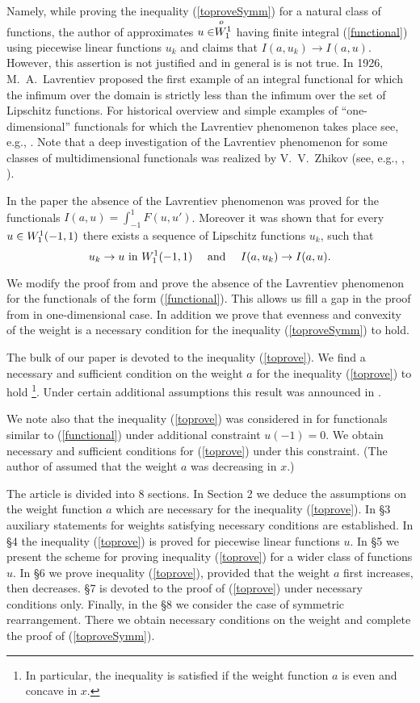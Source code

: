 Namely, while proving the inequality (\ref{toproveSymm}) for a natural class of functions,
the author of \cite{Br} approximates $u \in \stackrel{o\ }{W_1^1}$ having finite integral (\ref{functional})
using piecewise linear functions $u_k$ and claims that $I(a, u_k) \to I(a, u)$.
However, this assertion is not justified and in general is is not true.
In 1926, M.~A.~Lavrentiev proposed the first example of an integral functional
for which the infimum over the domain is strictly less than the infimum over the set of 
Lipschitz functions. For historical overview and simple examples of ``one-dimensional'' 
functionals for which the Lavrentiev phenomenon takes place see, e.g., \cite{BGH}.
Note that a deep investigation of the Lavrentiev phenomenon for some classes of multidimensional 
functionals was realized by V.~V.~Zhikov (see, e.g., \cite{Zh1}, \cite{Zh2}).

In the paper \cite{ASC} the absence of the Lavrentiev phenomenon was proved for the functionals
$I(a, u) = \int_{-1}^1 F(u, u')$. Moreover it was shown that for every $u \in W_1^1(-1, 1)$ 
there exists a sequence of Lipschitz functions $u_k$, such that
\begin{equation}
\label{convergence}
u_k \to u \text{ in } \W (-1, 1) \quad \text{ and } \quad I (a, u_k) \to I (a, u).
\end{equation}

We modify the proof from \cite{ASC} and prove the absence of the Lavrentiev phenomenon
for the functionals of the form (\ref{functional}).
This allows us fill a gap in the proof from \cite{Br} in one-dimensional case.
In addition we prove that evenness and convexity of the weight is a necessary condition
for the inequality (\ref{toproveSymm}) to hold.

The bulk of our paper is devoted to the inequality (\ref{toprove}).
We find a necessary and sufficient condition on the weight $a$ for the inequality 
(\ref{toprove}) to hold%
\footnote{In particular, the inequality is satisfied if the weight function $a$ is even 
and concave in $x$.}.
Under certain additional assumptions this result was announced in \cite{DAN}.

We note also that the inequality (\ref{toprove}) was considered in \cite{Lan}
for functionals similar to (\ref{functional}) under additional constraint $u(-1) = 0$.
We obtain necessary and sufficient conditions for (\ref{toprove}) under this constraint.
(The author of \cite{Lan} assumed that the weight $a$ was decreasing in $x$.)

The article is divided into 8 sections.
In Section 2 we deduce the assumptions on the weight function $a$ which are necessary for the 
inequality (\ref{toprove}).
In \S3 auxiliary statements for weights satisfying necessary conditions are established.
In \S4 the inequality (\ref{toprove}) is proved for piecewise linear functions $u$.
In \S5 we present the scheme for proving inequality (\ref{toprove}) for a wider class of 
functions $u$.
In \S6 we prove inequality (\ref{toprove}), provided that the weight $a$ first increases, 
then decreases.
\S7 is devoted to the proof of (\ref{toprove}) under necessary conditions only.
Finally, in the \S8 we consider the case of symmetric rearrangement.
There we obtain necessary conditions on the weight and complete the proof of (\ref{toproveSymm}).
